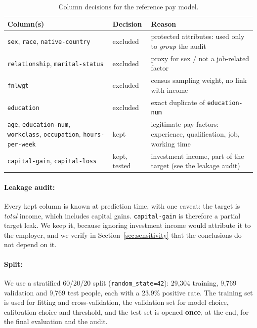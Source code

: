 \documentclass[11pt,a4paper]{article}
\begin{document}
\begin{table}[H]
\centering\small
\caption{Column decisions for the reference pay model.}
\label{tab:columns}
\begin{tabularx}{\textwidth}{>{\raggedright\arraybackslash}p{5.6cm}l>{\raggedright\arraybackslash}X}
\toprule
\rowcolor{headblue}
Column(s) & Decision & Reason \\
\midrule
\texttt{sex}, \texttt{race}, \texttt{native-country} & excluded & protected attributes: used only to \emph{group} the audit \\
\texttt{relationship}, \texttt{marital-status} & excluded & proxy for sex / not a job-related factor \\
\texttt{fnlwgt} & excluded & census sampling weight, no link with income \\
\texttt{education} & excluded & exact duplicate of \texttt{education-num} \\
\texttt{age}, \texttt{education-num}, \texttt{workclass}, \texttt{occupation}, \texttt{hours-per-week} & kept & legitimate pay factors: experience, qualification, job, working time \\
\texttt{capital-gain}, \texttt{capital-loss} & kept, tested & investment income, part of the target (see the leakage audit) \\
\bottomrule
\end{tabularx}
\end{table}

\paragraph{Leakage audit:} Every kept column is known at prediction time, with one caveat: the target is \emph{total} income, which includes capital gains. \texttt{capital-gain} is therefore a partial target leak. We keep it, because ignoring investment income would attribute it to the employer, and we verify in Section~\ref{sec:sensitivity} that the conclusions do not depend on it.

\paragraph{Split:} We use a stratified 60/20/20 split (\texttt{random\_state=42}): 29{,}304 training, 9{,}769 validation and 9{,}769 test people, each with a 23.9\% positive rate. The training set is used for fitting and cross-validation, the validation set for model choice, calibration choice and threshold, and the test set is opened \textbf{once}, at the end, for the final evaluation and the audit.
\end{document}
